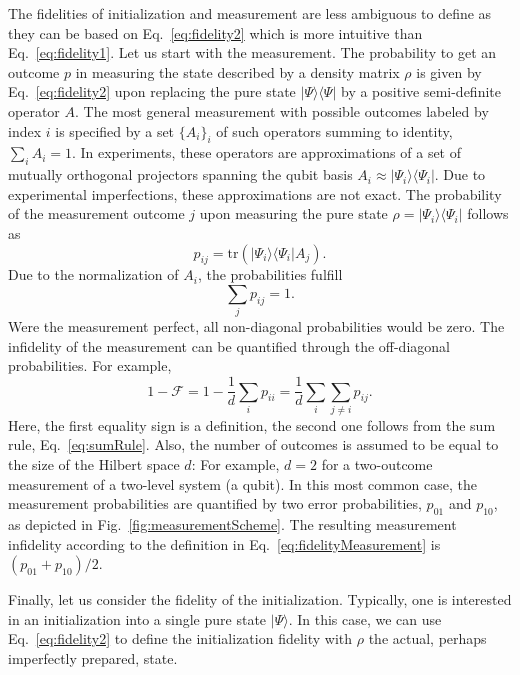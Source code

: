 \documentclass[aps, prx, showpacs, twocolumn, superscriptaddress, notitlepage, longbibliography, floatfix, nofootinbib]{revtex4-2}
\begin{document}
The fidelities of initialization and measurement are less ambiguous to define as they can be based on Eq.~\eqref{eq:fidelity2} which is more intuitive than Eq.~\eqref{eq:fidelity1}. Let us start with the measurement. The probability to get an outcome $p$ in measuring the state described by a density matrix $\rho$ is given by Eq.~\eqref{eq:fidelity2} upon replacing the pure state $|\Psi\rangle\langle\Psi|$ by a positive semi-definite operator $A$. 
The most general measurement with possible outcomes labeled by index $i$ is specified by a set $\{A_i\}_i$ of such operators summing to identity, $\sum_i A_i = 1$. In experiments, these operators are approximations of a set of mutually orthogonal projectors spanning the qubit basis $A_i \approx |\Psi_i\rangle \langle \Psi_i|$. Due to experimental imperfections, these approximations are not exact. The probability of the measurement outcome $j$ upon measuring the pure state $\rho=|\Psi_i\rangle\langle\Psi_i|$ follows as
\begin{equation}
p_{ij} = \mathrm{tr} \left(  |\Psi_i\rangle\langle \Psi_i| A_j \right).
\end{equation}
Due to the normalization of $A_i$, the probabilities fulfill
\begin{equation}
\sum_j p_{ij}=1.
\label{eq:sumRule}
\end{equation}
Were the measurement perfect, all non-diagonal probabilities would be zero. The infidelity of the measurement can be quantified through the off-diagonal probabilities. For example,
\begin{equation}
1-\mathcal{F} = 1 - \frac{1}{d} \sum_i p_{ii} = \frac{1}{d} \sum_i \sum_{j\neq i} p_{ij}.
\label{eq:fidelityMeasurement}
\end{equation}
Here, the first equality sign is a definition, the second one follows from the sum rule, Eq.~\eqref{eq:sumRule}. Also, the number of outcomes is assumed to be equal to the size of the Hilbert space $d$: For example, $d=2$ for a two-outcome measurement of a two-level system (a qubit). In this most common case, the measurement probabilities are quantified by two error probabilities, $p_{01}$ and $p_{10}$, as depicted in Fig.~\ref{fig:measurementScheme}. The resulting measurement infidelity according to the definition in Eq.~\eqref{eq:fidelityMeasurement} is $(p_{01}+p_{10})/2$.

Finally, let us consider the fidelity of the initialization. Typically, one is interested in an initialization into a single pure state $|\Psi\rangle$. In this case, we can use Eq.~\eqref{eq:fidelity2} to define the initialization fidelity with $\rho$ the actual, perhaps imperfectly prepared, state. 
\end{document}
